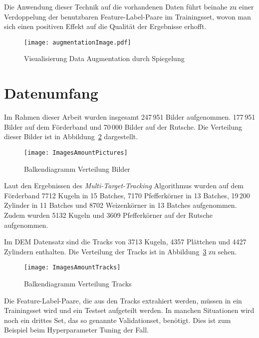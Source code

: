 Die Anwendung dieser Technik auf die vorhandenen Daten führt beinahe zu einer Verdoppelung 
der benutzbaren Feature-Label-Paare im Trainingsset, wovon man sich einen positiven Effekt auf die Qualität der Ergebnisse erhofft.

\begin{figure}[h]
	\centering
	\texttt{[image: augmentationImage.pdf]}
	\caption{Visualisierung Data Augmentation durch Spiegelung}
	\label{fig:dataAugm}
\end{figure}



\section{Datenumfang}

Im Rahmen dieser Arbeit wurden insgesamt 247\,951 Bilder aufgenommen.
177\,951 Bilder auf dem Förderband und 70\,000 Bilder auf der Rutsche.
Die Verteilung dieser Bilder ist in Abbildung~\ref{fig:barPics} dargestellt.

\begin{figure}[h]
	\centering
	\texttt{[image: ImagesAmountPictures]}
	\caption{Balkendiagramm Verteilung Bilder}
	\label{fig:barPics}
\end{figure}

Laut den Ergebnissen des \textit{Multi-Target-Tracking} Algorithmus wurden auf dem Förderband 
7712 Kugeln in 15 Batches,
7170 Pfefferkörner in 13 Batches,
19\,200 Zylinder in 11 Batches
und 8702 Weizenkörner in 13 Batches aufgenommen.
Zudem wurden 5132 Kugeln und 3609 Pfefferkörner auf der Rutsche aufgenommen.

Im DEM Datensatz sind die Tracks von 3713 Kugeln, 4357 Plättchen und 4427 Zylindern enthalten.
Die Verteilung der Tracks ist in Abbildung~\ref{fig:barTracks} zu sehen.

\begin{figure}[h]
	\centering
	\texttt{[image: ImagesAmountTracks]}
	\caption{Balkendiagramm Verteilung Tracks}
	\label{fig:barTracks}
\end{figure}

Die Feature-Label-Paare, die aus den Tracks extrahiert werden, 
müssen in ein Trainingsset wird und ein Testset aufgeteilt werden.
In manchen Situationen wird noch ein drittes Set, das so genannte Validationset, benötigt.
Dies ist zum Beispiel beim Hyperparameter Tuning der Fall.

